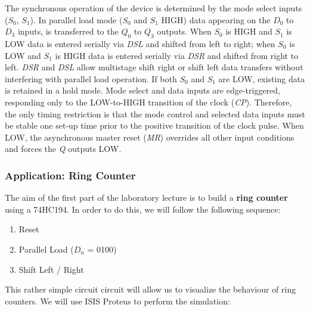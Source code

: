 The synchronous operation of the device is determined by the mode select inputs ($\mathit{S_0}$, $\mathit{S_1}$). In parallel load mode ($\mathit{S_0}$ and $\mathit{S_1}$ HIGH) data appearing on the $\mathit{D_0}$ to $\mathit{D_3}$ inputs, is transferred to the $\mathit{Q_0}$ to $\mathit{Q_3}$ outputs. When $\mathit{S_0}$ is HIGH and $\mathit{S_1}$ is LOW data is entered serially via \textit{DSL} and shifted from left to right; when $\mathit{S_0}$ is LOW and $\mathit{S_1}$ is HIGH data is entered serially via \textit{DSR} and shifted from right to left. \textit{DSR} and \textit{DSL} allow multistage shift right or shift left data transfers without interfering with parallel load operation. If both $\mathit{S_0}$ and $\mathit{S_1}$ are LOW, existing data is retained in a hold mode. Mode select and data inputs are edge-triggered, responding only to the LOW-to-HIGH transition of the clock (\textit{CP}). Therefore, the only timing restriction is that the mode control and selected data inputs must be stable one set-up time prior to the positive transition of the clock pulse. When LOW, the asynchronous master reset (\textit{MR}) overrides all other input conditions and forces the \textit{Q} outputs LOW. ~\autocite{74HC194}

\clearpage

\subsubsection{Application: Ring Counter}

The aim of the first part of the laboratory lecture is to build a \textbf{ring counter} using a 74HC194. In order to do this, we will follow the following sequence:

\begin{enumerate}
    \item Reset
    \item Parallel Load ($D_n$ = 0100)
    \item Shift Left / Right
\end{enumerate}

This rather simple circuit circuit will allow us to visualize the behaviour of ring counters. We will use ISIS Proteus to perform the simulation:

